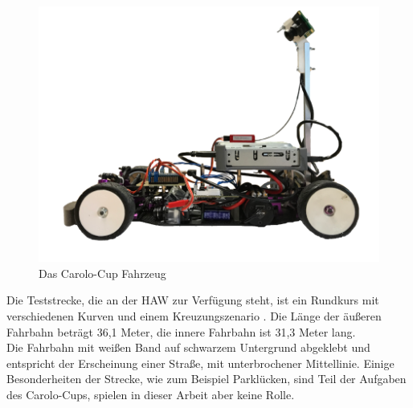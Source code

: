 \begin{figure}[h]
	\centering
	\includegraphics[scale=0.3]{figures/Fahrzeug.png}
	\caption{Das Carolo-Cup Fahrzeug}
	\label{img:Carolo-Fahrzeug}
\end{figure}

Die Teststrecke, die an der HAW zur Verfügung steht, ist ein Rundkurs mit verschiedenen Kurven und einem Kreuzungszenario . Die Länge der äußeren Fahrbahn beträgt 36,1 Meter, die innere Fahrbahn ist 31,3 Meter lang.\\
Die Fahrbahn mit weißen Band auf schwarzem Untergrund abgeklebt und entspricht der Erscheinung einer Straße, mit unterbrochener Mittellinie. Einige Besonderheiten der Strecke, wie zum Beispiel Parklücken, sind Teil der Aufgaben des Carolo-Cups, spielen in dieser Arbeit aber keine Rolle.


